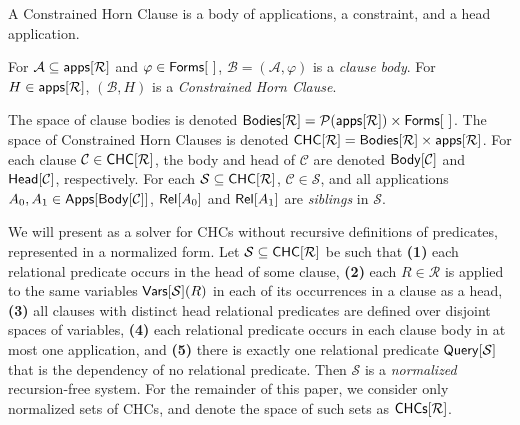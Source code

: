A Constrained Horn Clause is a body of applications, a constraint, and
a head application.
%
\begin{defn}
  \label{defn:chcs-structure}
  For $\mathcal{A} \subseteq \mathsf{apps}[ \mathcal{R} ]$ and %
  $\varphi \in \formulas$, $\mathcal{B} = (\mathcal{A}, \varphi)$ is a
  \emph{clause body}.
  For $H \in \mathsf{apps}[ \mathcal{R} ]$, $(\mathcal{B}, H)$ is a
  \emph{Constrained Horn Clause}.
\end{defn}
The space of clause bodies is denoted $\bodies{ \mathcal{R} } =
\pset(\apps{\mathcal{R}}) \times \formulas$.
The space of Constrained Horn Clauses is denoted $\mathsf{CHC}[ \mathcal{R} ] =
\mathsf{Bodies}[  \mathcal{R}  ] \times \mathsf{apps}[ \mathcal{R} ]$.
%
For each clause $\mathcal{C} \in \mathsf{CHC}[ \mathcal{R} ]$, the body and head
of $\mathcal{C}$ are denoted $\mathsf{Body}[  \mathcal{C}  ]$ and $\mathsf{Head}[ 
  \mathcal{C}  ]$, respectively.
For each $\mathcal{S} \subseteq \mathsf{CHC}[  \mathcal{R}  ]$, $\mathcal{C} \in
\mathcal{S}$, and all applications $A_0, A_1 \in \mathsf{Apps}[  \mathsf{Body}[ 
    \mathcal{C}  ]  ]$, $\mathsf{Rel}[ A_0 ]$ and $\mathsf{Rel}[ A_1 ]$ are
\emph{siblings} in $\mathcal{S}$.

We will present \sys as a solver for CHCs without recursive
definitions of predicates, represented in a normalized form.
Let $\mathcal{S} \subseteq \mathsf{CHC}[  \mathcal{R}  ]$ be such that %
\textbf{(1)} each relational predicate occurs in the head of some
clause, %
\textbf{(2)} each $R \in \mathcal{R}$ is applied to the same variables
$\mathsf{Vars}[  \mathcal{S} ](R)$ in each of its occurrences in a clause as a
head, %
\textbf{(3)} all clauses with distinct head relational predicates are
defined over disjoint spaces of variables, %
\textbf{(4)} each relational predicate occurs in each clause body in
at most one application, and %
\textbf{(5)} there is exactly one relational predicate $\mathsf{Query}[ 
  \mathcal{S}  ]$ that is the dependency of no relational predicate.
%
Then $\mathcal{S}$ is a \emph{normalized} recursion-free system.
%
For the remainder of this paper, we consider only normalized sets of
CHCs, and denote the space of such sets as $\mathsf{CHCs}[ \mathcal{R} ]$.


